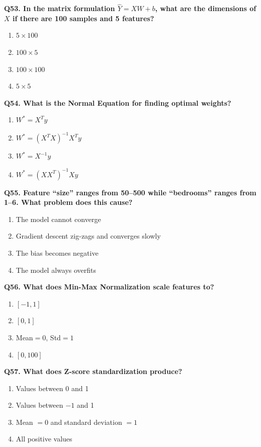 \documentclass[12pt, a4paper]{article}
\newcommand{\question}[1]{\vspace{0.6em}\noindent\textbf{#1}}
\begin{document}
\question{Q53. In the matrix formulation $\hat{Y} = XW + b$, what are the dimensions of $X$ if there are 100 samples and 5 features?}
\begin{enumerate}[label=\alph*)]
    \item $5 \times 100$
    \item $100 \times 5$
    \item $100 \times 100$
    \item $5 \times 5$
\end{enumerate}

\question{Q54. What is the Normal Equation for finding optimal weights?}
\begin{enumerate}[label=\alph*)]
    \item $W^* = X^Ty$
    \item $W^* = (X^TX)^{-1}X^Ty$
    \item $W^* = X^{-1}y$
    \item $W^* = (XX^T)^{-1}Xy$
\end{enumerate}

\question{Q55. Feature ``size'' ranges from 50--500 while ``bedrooms'' ranges from 1--6. What problem does this cause?}
\begin{enumerate}[label=\alph*)]
    \item The model cannot converge
    \item Gradient descent zig-zags and converges slowly
    \item The bias becomes negative
    \item The model always overfits
\end{enumerate}

\question{Q56. What does Min-Max Normalization scale features to?}
\begin{enumerate}[label=\alph*)]
    \item $[-1, 1]$
    \item $[0, 1]$
    \item Mean$=0$, Std$=1$
    \item $[0, 100]$
\end{enumerate}

\question{Q57. What does Z-score standardization produce?}
\begin{enumerate}[label=\alph*)]
    \item Values between 0 and 1
    \item Values between $-1$ and 1
    \item Mean $= 0$ and standard deviation $= 1$
    \item All positive values
\end{enumerate}
\end{document}
